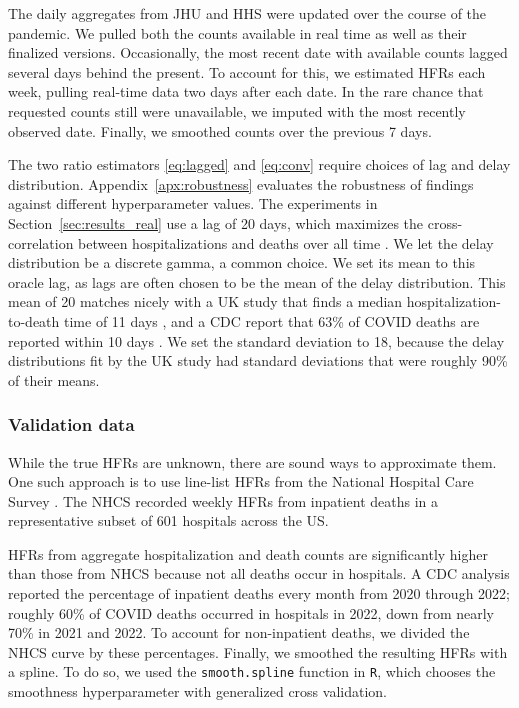 \documentclass{article}
\begin{document}
The daily aggregates from JHU and HHS were updated over the course of the pandemic. We pulled both the counts available in real time as well as their finalized versions. Occasionally, the most recent date with available counts lagged several days behind the present. To account for this, we estimated HFRs each week, pulling real-time data two days after each date. In the rare chance that requested counts still were unavailable, we imputed with the most recently observed date. Finally, we smoothed counts over the previous 7 days.

The two ratio estimators \eqref{eq:lagged} and \eqref{eq:conv} require choices of lag and delay distribution. Appendix~\ref{apx:robustness} evaluates the robustness of findings against different hyperparameter values. The experiments in Section~\ref{sec:results_real} use a lag of 20 days, which maximizes the cross-correlation between hospitalizations and deaths over all time \citep{atlantic}. We let the delay distribution be a discrete gamma, a common choice. We set its mean to this oracle lag, as lags are often chosen to be the mean of the delay distribution. This mean of 20 matches nicely with a UK study that finds a median hospitalization-to-death time of 11 days \citep{UKdelay}, and a CDC report that 63\% of COVID deaths are reported within 10 days \citep{cdc_deaths_demographic_geographic_2023}. We set the standard deviation to 18, because the delay distributions fit by the UK study had standard deviations that were roughly 90\% of their means. 

\subsubsection{Validation data}
While the true HFRs are unknown, there are sound ways to approximate them. One such approach is to use line-list HFRs from the National Hospital Care Survey \citep{NHCS2023}. The NHCS recorded weekly HFRs from inpatient deaths in a representative subset of 601 hospitals across the US.

HFRs from aggregate hospitalization and death counts are significantly higher than those from NHCS because not all deaths occur in hospitals. A CDC analysis reported the percentage of inpatient deaths every month from 2020 through 2022; roughly 60\% of COVID deaths occurred in hospitals in 2022, down from nearly 70\% in 2021 and 2022. To account for non-inpatient deaths, we divided the NHCS curve by these percentages. Finally, we smoothed the resulting HFRs with a spline. To do so, we used the \texttt{smooth.spline} function in \texttt{R}, which chooses the smoothness hyperparameter with generalized cross validation. 
\end{document}
